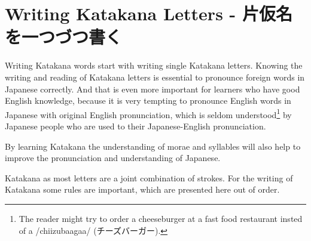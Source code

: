 \section{Writing Katakana Letters - 片仮名を一つづつ書く} \label{sec:WritingKatakanaLetters}

Writing Katakana words start with writing single Katakana letters. Knowing the
writing and reading of Katakana letters is essential to pronounce foreign words
in Japanese correctly. And that is even more important for learners who have
good English knowledge, because it is very tempting to pronounce English words
in Japanese with original English pronunciation, which is seldom
understood\footnote{The reader might try to order a cheeseburger at a fast food
restaurant insted of a /chiizubaagaa/ (チーズバーガー).} by Japanese people
who are used to their Japanese-English pronunciation. 

By learning Katakana the understanding of morae and syllables will also 
help to improve the pronunciation and understanding of Japanese. 

Katakana as most letters are a joint combination of strokes. For the writing of Katakana
some rules are important, which are presented here out of order.



